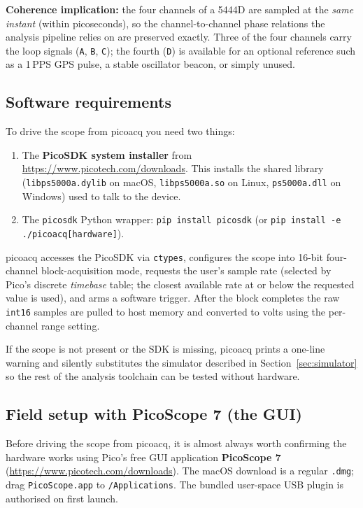 \documentclass[11pt]{article}
\begin{document}
\noindent\textbf{Coherence implication:} the four channels of a
5444D are sampled at the \emph{same instant} (within picoseconds), so
the channel-to-channel phase relations the analysis pipeline relies
on are preserved exactly.  Three of the four channels carry the
loop signals (\texttt{A}, \texttt{B}, \texttt{C}); the fourth
(\texttt{D}) is available for an optional reference such as a 1\,PPS
GPS pulse, a stable oscillator beacon, or simply unused.

\subsection{Software requirements}

To drive the scope from \textsf{picoacq} you need two things:

\begin{enumerate}\itemsep=2pt
\item The \textbf{PicoSDK system installer} from
      \url{https://www.picotech.com/downloads}.  This installs the
      shared library (\texttt{libps5000a.dylib} on macOS,
      \texttt{libps5000a.so} on Linux,
      \texttt{ps5000a.dll} on Windows) used to talk to the device.
\item The \texttt{picosdk} Python wrapper:
      \texttt{pip install picosdk} (or
      \texttt{pip install -e ./picoacq[hardware]}).
\end{enumerate}

\textsf{picoacq} accesses the PicoSDK via \texttt{ctypes}, configures
the scope into 16-bit four-channel block-acquisition mode, requests
the user's sample rate (selected by Pico's discrete \emph{timebase}
table; the closest available rate at or below the requested value is
used), and arms a software trigger.  After the block completes the
raw \texttt{int16} samples are pulled to host memory and converted to
volts using the per-channel range setting.

If the scope is not present or the SDK is missing, \textsf{picoacq}
prints a one-line warning and silently substitutes the simulator
described in Section~\ref{sec:simulator} so the rest of the analysis
toolchain can be tested without hardware.

\subsection{Field setup with PicoScope 7 (the GUI)}

Before driving the scope from \textsf{picoacq}, it is almost always
worth confirming the hardware works using Pico's free GUI application
\textbf{PicoScope 7} (\url{https://www.picotech.com/downloads}).
The macOS download is a regular \texttt{.dmg}; drag
\texttt{PicoScope.app} to \texttt{/Applications}.  The bundled
user-space USB plugin is authorised on first launch.
\end{document}
